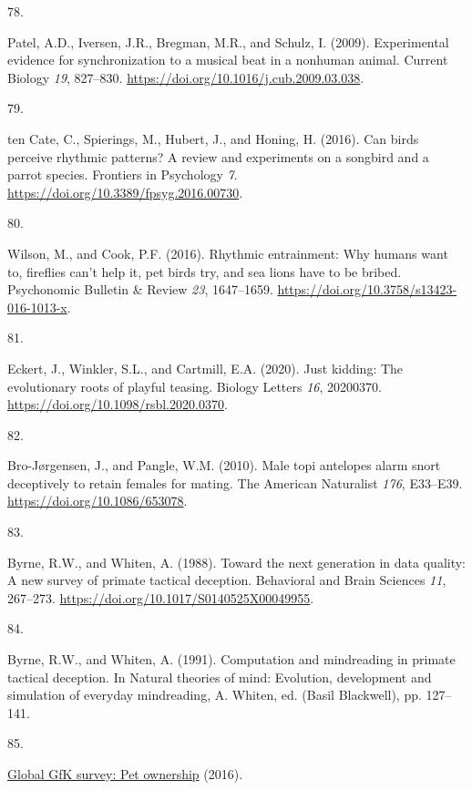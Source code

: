 \documentclass[
  man, donotrepeattitle,floatsintext]{apa6}
\newlength{\cslhangindent}
\newlength{\csllabelwidth}
\newlength{\cslentryspacingunit} %
\newenvironment{CSLReferences}[2] %
 {%
  \setlength{\parindent}{0pt}
  \ifodd #1
  \let\oldpar\par
  \def\par{\hangindent=\cslhangindent\oldpar}
  \fi
  \setlength{\parskip}{#2\cslentryspacingunit}
 }%
 {}
\newcommand{\CSLLeftMargin}[1]{\parbox[t]{\csllabelwidth}{#1}}
\newcommand{\CSLRightInline}[1]{\parbox[t]{\linewidth - \csllabelwidth}{#1}\break}
\begin{document}
\begin{CSLReferences}{0}{0}
\leavevmode{}%
\CSLLeftMargin{78. }%
\CSLRightInline{Patel, A.D., Iversen, J.R., Bregman, M.R., and Schulz, I. (2009). Experimental evidence for synchronization to a musical beat in a nonhuman animal. Current Biology \emph{19}, 827--830. \url{https://doi.org/10.1016/j.cub.2009.03.038}.}

\leavevmode{}%
\CSLLeftMargin{79. }%
\CSLRightInline{ten Cate, C., Spierings, M., Hubert, J., and Honing, H. (2016). Can birds perceive rhythmic patterns? A review and experiments on a songbird and a parrot species. Frontiers in Psychology \emph{7}. \url{https://doi.org/10.3389/fpsyg.2016.00730}.}

\leavevmode{}%
\CSLLeftMargin{80. }%
\CSLRightInline{Wilson, M., and Cook, P.F. (2016). Rhythmic entrainment: Why humans want to, fireflies can't help it, pet birds try, and sea lions have to be bribed. Psychonomic Bulletin \& Review \emph{23}, 1647--1659. \url{https://doi.org/10.3758/s13423-016-1013-x}.}

\leavevmode{}%
\CSLLeftMargin{81. }%
\CSLRightInline{Eckert, J., Winkler, S.L., and Cartmill, E.A. (2020). Just kidding: The evolutionary roots of playful teasing. Biology Letters \emph{16}, 20200370. \url{https://doi.org/10.1098/rsbl.2020.0370}.}

\leavevmode{}%
\CSLLeftMargin{82. }%
\CSLRightInline{Bro-Jørgensen, J., and Pangle, W.M. (2010). Male topi antelopes alarm snort deceptively to retain females for mating. The American Naturalist \emph{176}, E33--E39. \url{https://doi.org/10.1086/653078}.}

\leavevmode{}%
\CSLLeftMargin{83. }%
\CSLRightInline{Byrne, R.W., and Whiten, A. (1988). Toward the next generation in data quality: A new survey of primate tactical deception. Behavioral and Brain Sciences \emph{11}, 267--273. \url{https://doi.org/10.1017/S0140525X00049955}.}

\leavevmode{}%
\CSLLeftMargin{84. }%
\CSLRightInline{Byrne, R.W., and Whiten, A. (1991). Computation and mindreading in primate tactical deception. In Natural theories of mind: Evolution, development and simulation of everyday mindreading, A. Whiten, ed. (Basil Blackwell), pp. 127--141.}

\leavevmode{}%
\CSLLeftMargin{85. }%
\CSLRightInline{\href{http://www.gfk.com/global-studies/global-studies-pet-ownership}{Global GfK survey: Pet ownership} (2016).}


\end{CSLReferences}
\end{document}
